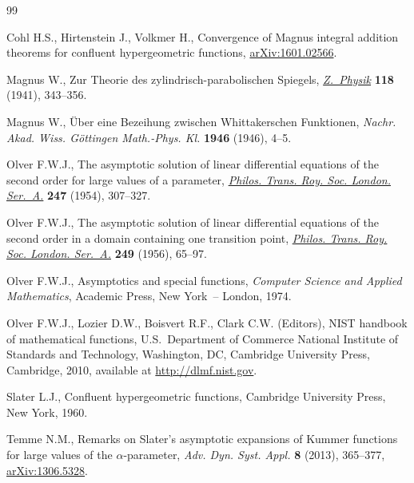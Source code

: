 \documentclass[pdftex]{sigma}
\numberwithin{equation}{section}
\begin{document}
\begin{thebibliography}{99}
\footnotesize\itemsep=0pt

Cohl H.S., Hirtenstein J., Volkmer H., Convergence of {M}agnus integral
 addition theorems for conf\/luent hypergeometric functions,
 \href{http://arxiv.org/abs/1601.02566}{arXiv:1601.02566}.

Magnus W., Zur {T}heorie des zylindrisch-parabolischen {S}piegels,
 \href{http://dx.doi.org/10.1007/BF01364678}{\textit{Z.~Physik}} \textbf{118} (1941), 343--356.

Magnus W., \"{U}ber eine {B}ezeihung zwischen {W}hittakerschen {F}unktionen,
 \textit{Nachr. Akad. Wiss. G\"ottingen Math.-Phys. Kl.} \textbf{1946} (1946),
 4--5.

Olver F.W.J., The asymptotic solution of linear dif\/ferential equations of the
 second order for large values of a parameter, \href{http://dx.doi.org/10.1098/rsta.1954.0020}{\textit{Philos. Trans. Roy.
 Soc. London. Ser.~A.}} \textbf{247} (1954), 307--327.

Olver F.W.J., The asymptotic solution of linear dif\/ferential equations of the
 second order in a domain containing one transition point, \href{http://dx.doi.org/10.1098/rsta.1956.0015}{\textit{Philos.
 Trans. Roy. Soc. London. Ser.~A.}} \textbf{249} (1956), 65--97.

Olver F.W.J., Asymptotics and special functions, \textit{Computer Science and Applied
 Mathematics}, Academic Press, New York~-- London, 1974.

Olver F.W.J., Lozier D.W., Boisvert R.F., Clark C.W. (Editors), N{IST} handbook
 of mathematical functions, U.S.~Department of Commerce National Institute of
 Standards and Technology, Washington, DC, Cambridge University Press,
 Cambridge, 2010, {a}vailable at \url{http://dlmf.nist.gov}.

Slater L.J., Conf\/luent hypergeometric functions, Cambridge University Press,
 New York, 1960.

Temme N.M., Remarks on {S}later's asymptotic expansions of {K}ummer functions
 for large values of the {$\alpha$}-parameter, \textit{Adv. Dyn. Syst. Appl.}
 \textbf{8} (2013), 365--377, \href{http://arxiv.org/abs/1306.5328}{arXiv:1306.5328}.

\end{thebibliography}\LastPageEnding
\end{document}
